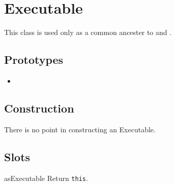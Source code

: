 \section{Executable}

This class is used only as a common ancester to 
and .

\subsection{Prototypes}
\begin{itemize}
\item {}
\end{itemize}

\subsection{Construction}

There is no point in constructing an Executable.

\subsection{Slots}

\begin{urbiscriptapi}
\item[asExecutable] Return \lstinline|this|.
\end{urbiscriptapi}


